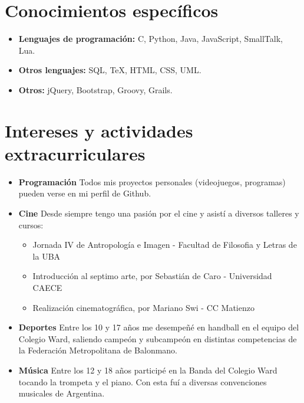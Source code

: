 \documentclass[11pt,a4paper]{moderncv}
\begin{document}
\section{Conocimientos específicos}
\begin{itemize}
\item \textbf{Lenguajes de programación:} C, Python, Java, JavaScript, SmallTalk, Lua.
\item \textbf{Otros lenguajes:} SQL, TeX, HTML, CSS, UML.
\item \textbf{Otros:} jQuery, Bootstrap, Groovy, Grails.
\end{itemize}

\section{Intereses y actividades extracurriculares}
\begin{itemize}
\item \textbf{Programación} Todos mis proyectos personales (videojuegos, programas) pueden verse en mi perfil de Github.
\item \textbf{Cine} Desde siempre tengo una pasión por el cine y asistí a diversos talleres y cursos:
\begin{itemize}
\item{Jornada IV de Antropología e Imagen - Facultad de Filosofia y Letras de la UBA}
\item{Introducción al septimo arte, por Sebastián de Caro - Universidad CAECE}
\item{Realización cinematográfica, por Mariano Swi - CC Matienzo}
\end{itemize}
\item \textbf{Deportes} Entre los 10 y 17 años me desempeñé en handball en el equipo del Colegio Ward, saliendo campeón y subcampeón en distintas competencias de la Federación Metropolitana de Balonmano.
\item \textbf{Música} Entre los 12 y 18 años participé en la Banda del Colegio Ward tocando la trompeta y el piano. Con esta fuí a diversas convenciones musicales de Argentina.
\end{itemize}
\end{document}
